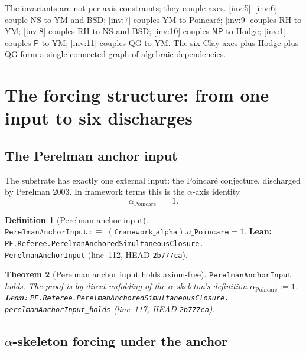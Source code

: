 \documentclass[11pt,a4paper]{article}
\theoremstyle{plain}
\newtheorem{theorem}{Theorem}[section]
\theoremstyle{definition}
\newtheorem{definition}[theorem]{Definition}
\begin{document}
The invariants are not per-axis constraints; they couple axes.
\eqref{inv:5}--\eqref{inv:6} couple NS to YM and BSD;
\eqref{inv:7} couples YM to Poincar\'e; \eqref{inv:9} couples RH
to YM; \eqref{inv:8} couples RH to NS and BSD; \eqref{inv:10}
couples $\mathsf{NP}$ to Hodge; \eqref{inv:1} couples
$\mathsf{P}$ to YM; \eqref{inv:11} couples QG to YM.
The six Clay axes plus Hodge plus QG form a single connected
graph of algebraic dependencies.

\section{The forcing structure: from one input to six discharges}
\label{sec:forcing}

\subsection{The Perelman anchor input}
\label{sec:perelman-input}

The substrate has exactly one external input: the Poincar\'e
conjecture, discharged by Perelman 2003. In framework terms this is
the $\alpha$-axis identity
\[
\alpha_{\mathrm{Poincar\acute e}} \;=\; 1.
\]

\begin{definition}[Perelman anchor input]
\label{def:perelman-input}
$\mathtt{PerelmanAnchorInput} \;:\equiv\;
(\mathtt{framework\_alpha}).a\_\mathtt{Poincare} = 1$.
\textbf{Lean:}
\texttt{PF.Referee.PerelmanAnchoredSimultaneousClosure.\\
PerelmanAnchorInput}
(line~112, HEAD \texttt{2b777ca}).
\end{definition}

\begin{theorem}[Perelman anchor input holds axiom-free]
\label{thm:perelman-holds}
$\mathtt{PerelmanAnchorInput}$ holds. The proof is by direct
unfolding of the $\alpha$-skeleton's definition
$\alpha_{\mathrm{Poincar\acute e}} := 1$.
\textbf{Lean:}
\texttt{PF.Referee.PerelmanAnchoredSimultaneousClosure.\\
perelmanAnchorInput\_holds}
(line~117, HEAD \texttt{2b777ca}).
\end{theorem}

\subsection{$\alpha$-skeleton forcing under the anchor}
\label{sec:alpha-forcing}
\end{document}
